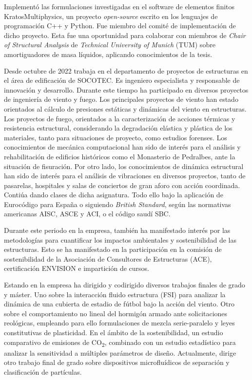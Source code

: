 \documentclass[12pt]{article}
\begin{document}
Implementó las formulaciones investigadas en el software de elementos finitos KratosMultiphysics, un proyecto \emph{open-source} escrito en los lenguajes de programación C++ y Python. Fue miembro del comité de implementación de dicho proyecto. Esta fue una oportunidad para colaborar con miembros de \emph{Chair of Structural Analysis} de \emph{Technical University of Munich} (TUM) sobre amortiguadores de masa líquidos, aplicando conocimientos de la tesis.

Desde octubre de 2022 trabaja en el departamento de proyectos de estructuras en el área de edificación de SOCOTEC. Es ingeniero especialista y responsable de innovación y desarrollo. Durante este tiempo ha participado en diversos proyectos de ingeniería de viento y fuego. Los principales proyectos de viento han estado orientados al cálculo de presiones estáticas y dinámicas del viento en estructuras. Los proyectos de fuego, orientados a la caracterización de acciones térmicas y resistencia estructural, considerando la degradación elástica y plástica de los materiales, tanto para situaciones de proyecto, como estudios forenses. Los conocimientos de mecánica computacional han sido de interés para el análisis y rehabilitación de edificios históricos como el Monasterio de Pedralbes, ante la situación de fisuración. Por otro lado, los conocimientos de dinámica estructural han sido de interés para el análisis de vibraciones en diversos proyectos, tanto de pasarelas, hospitales y salas de conciertos de gran aforo con acción coordinada. Contiúa dando clases de dicha asignatura. Todo ello bajo la aplicación de Eurocódigo para España o siguiendo \emph{British Standard}, según las normativas americanas AISC, ASCE y ACI, o el código saudí SBC.

Durante este periodo en la empresa, también ha manifestado interés por las metodologías para cuantificar los impactos ambientales y sostenibilidad de las estructuras. Esto se ha manifestado en la participación en la comisión de sostenibilidad de la Asociación de Consultores de Estructuras (ACE), certificación ENVISION e impartición de cursos.

Estando en la empresa ha dirigido y codirigido diversos trabajos finales de grado y máster. Uno sobre la interacción fluido estructura (FSI) para analizar la dinámica de una cubierta de estadio de fútbol bajo la acción del viento. Otro sobre el comportamiento no lineal del hormigón armado ante solicitaciones reológicas, empleando para ello formulaciones de mezcla serie-paralelo y leyes constitutivas de plasticidad. En el ámbito de la sostenibilidad, un estudio comparativo de emisiones de CO\textsubscript{2}, combinado con un estudio estadístico para analizar la sensitividad a múltiples parámetros de diseño. Actualmente, dirige otro trabajo final de grado sobre dispositivos microfluídicos de separación y clasificación de partículas.
\end{document}
